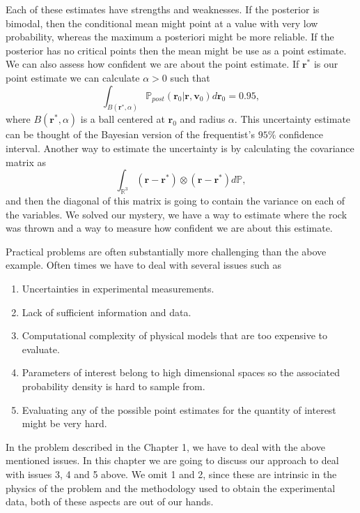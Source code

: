 \documentclass[12pt]{book}
\newcommand{\post}{\mathbb{P}_{post}}
\newcommand{\p}{\mathbb{P}}
\begin{document}
Each  of these estimates have strengths and weaknesses. If the posterior is bimodal, then the conditional
mean might point at a value with very low probability, whereas the maximum a posteriori might be more 
reliable. If the posterior has no critical points then the mean might be use as a point estimate. We can 
also assess how confident we are about the point estimate. If $\textbf{r}^{*}$ is our point
estimate we can calculate $\alpha>0$ such that
\begin{equation*}
\int_{B(\textbf{r}^{*},\alpha)}\post(\textbf{r}_{0}|\textbf{r},\textbf{v}_{0})d\textbf{r}_{0}=0.95,
\end{equation*}
where $B(\textbf{r}^{*},\alpha)$ is a ball centered at $\textbf{r}_{0}$ and radius $\alpha$. This 
uncertainty estimate can be thought of  the Bayesian version 
of the frequentist's $95\%$ confidence interval.
Another way to estimate the uncertainty is by calculating the covariance matrix as
\begin{equation*}
\int_{\mathbb{R}^{3}}(\textbf{r}-\textbf{r}^{*})\otimes(\textbf{r}-\textbf{r}^{*})d\p,
\end{equation*}
\newline
and then the diagonal of this matrix is going to contain the variance on each of the variables.
We solved our mystery, we have a way to estimate where the rock was thrown and a way to measure how
confident we are about this estimate. 
\newline


Practical problems are often substantially more challenging than the above example. Often times we have to 
deal with several issues such as 

\begin{enumerate}
\item Uncertainties in experimental measurements.
\item Lack of sufficient information and data.
\item Computational complexity of  physical models that are too expensive to evaluate.
\item Parameters of interest belong to high dimensional spaces so the associated probability density is 
hard to sample from.
\item Evaluating any of the possible point estimates for the quantity of interest might be very hard.
\end{enumerate}
In the problem described in the Chapter 1, we have to deal with the above mentioned issues.
In this chapter we are going to discuss our approach to deal with issues 3, 4 and 5 above. We 
omit 1 and 2, since these  are intrinsic in the physics of the problem and   the methodology used 
to obtain the experimental data, both of these aspects are out of our hands.
\end{document}
